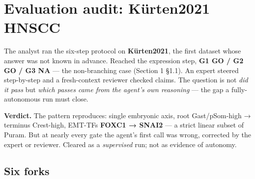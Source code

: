 \documentclass[11pt,a4paper]{article}
\begin{document}
\hypertarget{sec:3}{%
\section{Evaluation audit: Kürten2021 HNSCC}\label{sec:3}}

The analyst ran the six-step protocol on \textbf{Kürten2021}, the first
dataset whose answer was not known in advance. Reached the expression
step, \textbf{G1 GO / G2 GO / G3 NA} --- the non-branching case (Section
1 §1.1). An expert steered step-by-step and a fresh-context reviewer
checked claims. The question is not \emph{did it pass} but \emph{which
passes came from the agent's own reasoning} --- the gap a
fully-autonomous run must close.

\textbf{Verdict.} The pattern reproduces: single embryonic axis, root
Gast/pSom-high → terminus Crest-high, EMT-TFs \textbf{FOXC1 → SNAI2} ---
a strict linear subset of Puram. But at nearly every gate the agent's
first call was wrong, corrected by the expert or reviewer. Cleared as a
\emph{supervised} run; not as evidence of autonomy.

\hypertarget{six-forks}{%
\subsection{Six forks}\label{six-forks}}
\end{document}
